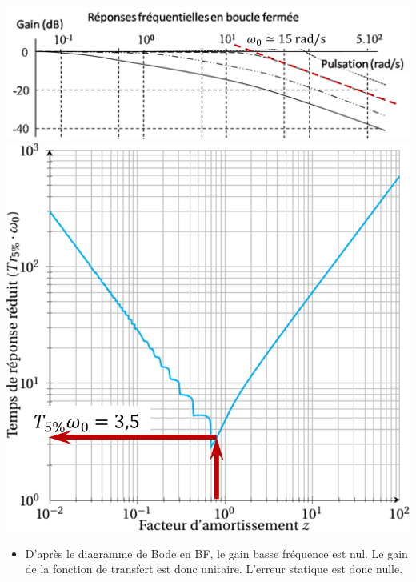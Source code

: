 \documentclass[10pt,fleqn]{article} %
\begin{document}
\begin{multicols}{2}
\begin{corrige}
\begin{center}
\includegraphics[width=\linewidth]{images/bf_cor}
\includegraphics[width=\linewidth]{images/abaque_tr_cor}
\end{center}

\begin{itemize}
\item D'après le diagramme de Bode en BF, le gain basse fréquence est nul. Le gain de la fonction de transfert est donc unitaire. L'erreur statique est donc nulle. 
\end{itemize}
\end{corrige}
\else
\fi



\ifprof
\else


\end{multicols}
\end{document}
